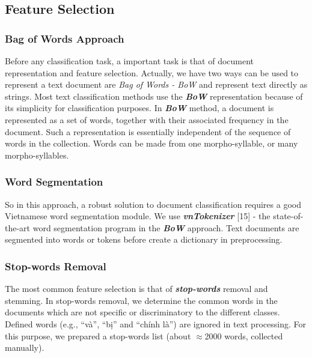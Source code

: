 \documentclass[conference]{IEEEtran}
\begin{document}
\subsection{Feature Selection}
\subsubsection{Bag of Words Approach}
Before any classification task, a important task is that of document representation and feature
selection. Actually, we have two ways can be used to represent a text document are \textit{Bag of Words - BoW} and represent text directly as strings. Most text classification
methods use the \textit{\textbf{BoW}} representation because of its simplicity
for classification purposes. In \textit{\textbf{BoW}} method, a document is represented as a set of
words, together with their associated frequency in the document. Such a representation is essentially independent of the sequence of words in the collection. Words can be made from one morpho-syllable, or
many morpho-syllables.
\subsubsection{Word Segmentation}
So in this approach, a robust solution to document classification requires a good Vietnamese word segmentation module. We use \textit{\textbf{vnTokenizer}} [15] - the state-of-the-art word segmentation program in the \textbf{\textit{BoW}} approach. Text documents are segmented into words or tokens before create a dictionary in preprocessing. 
\subsubsection{Stop-words Removal}
The most common feature selection is that of \textit{\textbf{stop-words}} removal and stemming.
In stop-words removal, we determine the common words in the documents
which are not specific or discriminatory to the different classes. Defined
words (e.g., \enquote{và}, \enquote{bị} and \enquote{chính là}) are ignored in text processing. For this purpose, we  prepared a stop-words list (about $\approx$2000 words, collected manually). 

\end{document}
